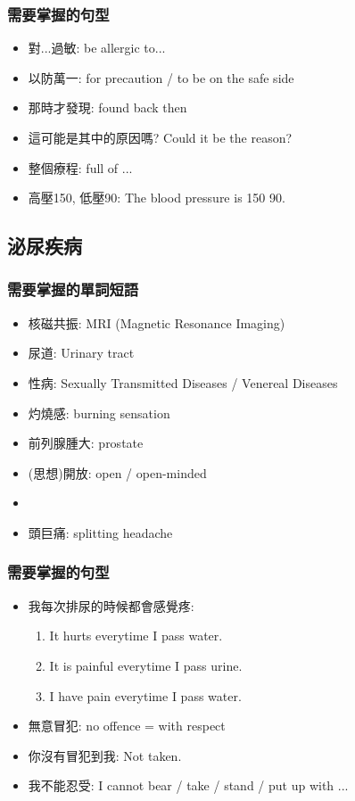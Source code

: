 \subsubsection*{需要掌握的句型}
\begin{itemize}
  \itemsep0em
  \item 對...過敏: be allergic to...
  \item 以防萬一: for precaution / to be on the safe side
  \item 那時才發現: found back then
  \item 這可能是其中的原因嗎? Could it be the reason?
  \item 整個療程: full  of ...
  \item 高壓150, 低壓90: The blood pressure is 150  90.
\end{itemize}

\subsection{泌尿疾病}
\subsubsection*{需要掌握的單詞短語}
\begin{itemize}
  \itemsep0em
  \item 核磁共振: MRI (Magnetic Resonance Imaging)
  \item 尿道: Urinary tract
  \item 性病: Sexually Transmitted Diseases / Venereal Diseases
  \item 灼燒感: burning sensation
  \item 前列腺腫大:  prostate
  \item (思想)開放: open / open-minded
  \item {}
  \item 頭巨痛: splitting headache
\end{itemize}

\subsubsection*{需要掌握的句型}
\begin{itemize}
  \itemsep0em
  \item 我每次排尿的時候都會感覺疼:
  \begin{enumerate}
    \itemsep0em
    \item It hurts everytime I pass water.
    \item It is painful everytime I pass urine. 
    \item I have pain everytime I pass water.
  \end{enumerate}
  \item 無意冒犯: no offence = with respect
  \item 你沒有冒犯到我: Not taken.
  \item 我不能忍受: I cannot bear / take / stand / put up with ...
\end{itemize}

